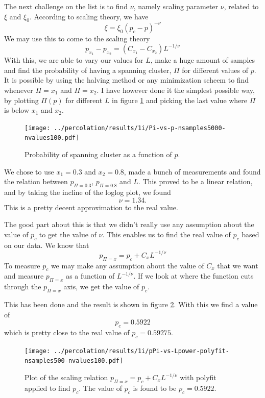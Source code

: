 \documentclass[a4paper,reprint,floatfix,amsmath,amssymb,aps,pra]{revtex4-1}
\begin{document}
The next challenge on the list is to find $\nu$, namely scaling parameter $\nu$, related to $\xi$ and $\xi_{0}$.
According to scaling theory, we have
\begin{equation}
  \xi = \xi_0 (p_{c} - p)^{-\nu}
\end{equation} 
We may use this to come to the scaling theory
\begin{equation}
  p_{x_{1}} - p_{x_{2}} = (C_{x_{1}} - C_{x_{2}}) L^{-1/\nu}
\end{equation} 
With this, we are able to vary our values for $L$, make a huge amount of samples and find the probability of having a spanning cluster, $\Pi$ for different values of $p$. It is possible by using the halving method or any minimization scheem to find whenever $\Pi = x_{1}$ and $\Pi = x_{2}$. I have however done it the simplest possible way, by plotting $\Pi(p)$ for different $L$ in figure \ref{fig:spanning-cluster-probability} and picking the last value where $\Pi$ is below $x_{1}$ and $x_{2}$.
%
\begin{figure}
  \centering
  \texttt{[image: ../percolation/results/1i/Pi-vs-p-nsamples5000-nvalues100.pdf]}
  \caption{Probability of spanning cluster as a function of $p$.}
  \label{fig:spanning-cluster-probability}
\end{figure}
%
We chose to use $x_{1}= 0.3$ and $x_{2} = 0.8$, made a bunch of measurements and found the relation between $p_{\Pi=0.3}$, $p_{\Pi=0.8}$ and $L$. This proved to be a linear relation, and by taking the incline of the loglog plot, we found 
\begin{equation}
  \nu = 1.34.
\end{equation} 
This is a pretty decent approximation to the real value.

The good part about this is that we didn't really use any assumption about the value of $p_{c}$ to get the value of $\nu$. This enables us to find the real value of $p_{c}$ based on our data. We know that
\begin{equation}
  p_{\Pi=x} = p_{c} + C_{x} L^{-1/\nu}
\end{equation} 
To measure $p_{c}$ we may make any assumption about the value of $C_{x}$ that we want and measure $p_{\Pi=x}$ as a function of $L^{-1/\nu}$. If we look at where the function cuts through the $p_{\Pi=x}$ axis, we get the value of $p_{c}$.

This has been done and the result is shown in figure \ref{fig:polyfit-pc}. With this we find a value of
\begin{equation}
  p_{c} = 0.5922
\end{equation} 
which is pretty close to the real value of $p_{c} = 0.59275$.
%
\begin{figure}
  \centering
  \texttt{[image: ../percolation/results/1i/pPi-vs-Lpower-polyfit-nsamples500-nvalues100.pdf]}
  \caption{Plot of the scaling relation $p_{\Pi=x} = p_{c} + C_{x} L^{-1/\nu}$ with polyfit applied to find $p_{c}$. The value of $p_{c}$ is found to be $p_{c} = 0.5922$.}
  \label{fig:polyfit-pc}
\end{figure}
%
\end{document}
